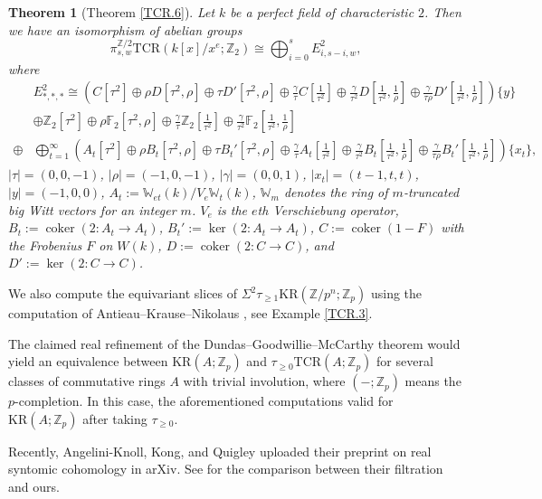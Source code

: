 \documentclass[10pt]{amsart}
\newtheorem{thm}{Theorem}[section]
\theoremstyle{definition}
\numberwithin{equation}{section}
\newcommand{\F}{\mathbb{F}}
\newcommand{\W}{\mathbb{W}}
\newcommand{\Z}{\mathbb{Z}}
\DeclareMathOperator{\coker}{coker}
\newcommand{\TCR}{\mathrm{TCR}}
\begin{document}
\begin{thm}[Theorem \ref{TCR.6}]
Let $k$ be a perfect field of characteristic $2$.
Then we have an isomorphism of abelian groups
\[
\pi_{s,w}^{\Z/2}\TCR(k[x]/x^e;\Z_2) 
\cong
\bigoplus_{i=0}^s E_{i,s-i,w}^2,
\]
where
\begin{align*}
&E_{*,*,*}^2
\cong 
(C[\tau^2]
\oplus
\rho D[\tau^2,\rho]
\oplus
\tau D'[\tau^2,\rho]
\oplus
\tfrac{\gamma}{\tau} C[\tfrac{1}{\tau^2}]
\oplus
\tfrac{\gamma}{\tau^2}D [\tfrac{1}{\tau^2},\tfrac{1}{\rho}] \oplus \tfrac{\gamma}{\tau \rho} D'[\tfrac{1}{\tau^2},\tfrac{1}{\rho}])\{y\}
\\
&\oplus 
\Z_2[\tau^2] \oplus \rho \F_2[\tau^2,\rho]
\oplus
\tfrac{\gamma}{\tau} \Z_2[\tfrac{1}{\tau^2}] \oplus \tfrac{\gamma}{\tau^2}\F_2 [\tfrac{1}{\tau^2},\tfrac{1}{\rho}]
\\
\oplus
&
\bigoplus_{t=1}^\infty
(
A_t[\tau^2]
\oplus
\rho B_t[\tau^2,\rho]
\oplus
\tau B_t'[\tau^2,\rho]
\oplus
\tfrac{\gamma}{\tau} A_t[\tfrac{1}{\tau^2}]
\oplus
\tfrac{\gamma}{\tau^2}B_t [\tfrac{1}{\tau^2},\tfrac{1}{\rho}] \oplus \tfrac{\gamma}{\tau \rho} B_t'[\tfrac{1}{\tau^2},\tfrac{1}{\rho}]
)
\{x_t\},
\end{align*}
$\lvert \tau\rvert =(0,0,-1)$,
$\lvert \rho \rvert = (-1,0,-1)$,
$\lvert \gamma \rvert = (0,0,1)$,
$\lvert x_t\rvert = (t-1,t,t)$,
$\lvert y \rvert = (-1,0,0)$,
$A_t:=\W_{et}(k)/V_e\W_{t}(k)$, $\W_{m}$ denotes the ring of $m$-truncated big Witt vectors for an integer $m$.
$V_e$ is the $e$th Verschiebung operator,
$B_t:=\coker(2\colon A_t\to A_t)$,
$B_t':=\ker(2\colon A_t\to A_t)$,
$C:=\coker(1-F)$ with the Frobenius $F$ on $W(k)$,
$D:=\coker(2\colon C\to C)$,
and $D':=\ker(2\colon C\to C)$.
\end{thm}

We also compute the equivariant slices of $\Sigma^2 \tau_{\geq 1}\mathrm{KR}(\mathbb{Z}/p^n;\mathbb{Z}_p)$ using the computation of Antieau--Krause--Nikolaus \cite{AKN},
see Example \ref{TCR.3}.


\medskip

The claimed real refinement of the Dundas--Goodwillie--McCarthy theorem would yield an equivalence between $\mathrm{KR}(A;\Z_p)$ and $\tau_{\geq 0}\TCR(A;\Z_p)$ for several classes of commutative rings $A$ with trivial involution,
where $(-;\Z_p)$ means the $p$-completion.
In this case,
the aforementioned computations valid for $\mathrm{KR}(A;\Z_p)$ after taking $\tau_{\geq 0}$.

\medskip

Recently,
Angelini-Knoll, Kong, and Quigley uploaded their preprint \cite{AKQ} on real syntomic cohomology in arXiv.
See \cite[Theorem 6.7]{AKQ} for the comparison between their filtration and ours.
\end{document}
